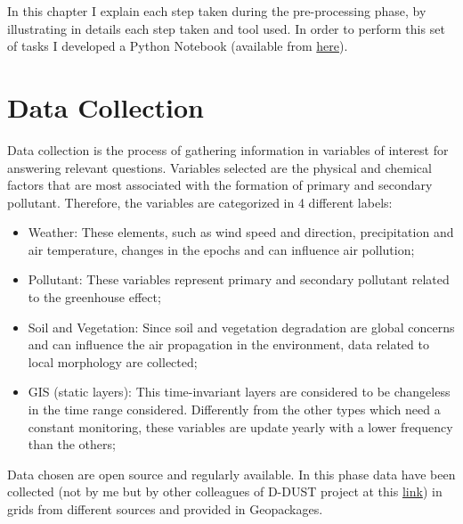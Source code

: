 In this chapter I explain each step taken during the pre-processing phase, by illustrating in details each step taken and tool used. \newline
In order to perform this set of tasks I developed a Python Notebook (available from \href{https://github.com/opengeolab/D-DUST/blob/thesis_MB/notebooks/fs_results.ipynb}{here}).
\section{Data Collection}
Data collection is the process of gathering information in variables of interest for answering relevant questions. \newline
Variables selected are the physical and chemical factors that are most associated with the formation of primary and secondary pollutant. \newline
Therefore, the variables are categorized in 4 different labels:
\begin{itemize}
\item Weather: These elements, such as wind speed and direction, precipitation and air temperature, changes in the epochs and can influence air pollution;
\item Pollutant: These variables represent primary and secondary pollutant related to the greenhouse effect;
\item Soil and Vegetation: Since soil and vegetation degradation are global concerns and can influence the air propagation in the environment, data related to local morphology are collected;
\item GIS (static layers): This time-invariant layers are considered to be changeless in the time range considered. Differently from the other types which need a constant monitoring, these variables are update yearly with a lower frequency than the others;
\end{itemize}
Data chosen are open source and regularly available.
In this phase data have been collected (not by me but by other colleagues of D-DUST project at this \href{https://docs.google.com/spreadsheets/d/1-5pwMSc1QlFyC8iIaA-l1fWhWtpqVio2/edit#gid=91313358}{link}) in grids from different sources and provided in Geopackages. 
